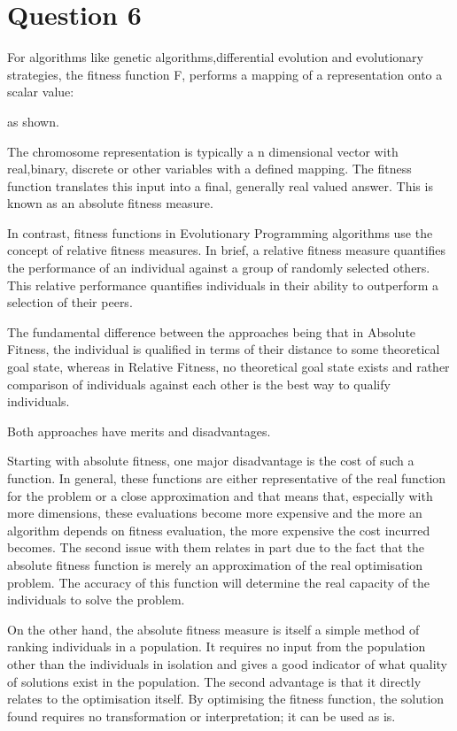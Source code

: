 \documentclass[12pt]{article}
\begin{document}
\section{Question 6}
For algorithms like genetic algorithms,differential evolution and evolutionary strategies, the fitness function F, performs a mapping of a representation onto a scalar value:

as shown.

The chromosome representation is typically a n dimensional vector with real,binary, discrete or other variables with a defined mapping. The fitness function translates this input into a final, generally real valued answer. This is known as an absolute fitness measure.

In contrast, fitness functions in Evolutionary Programming algorithms use the concept of relative fitness measures. In brief, a relative fitness measure quantifies the performance of an individual against a group of randomly selected others. This relative performance quantifies individuals in their ability to outperform a selection of their peers.

The fundamental difference between the approaches being that in Absolute Fitness, the individual is qualified in terms of their distance to some theoretical goal state, whereas in Relative Fitness, no theoretical goal state exists and rather comparison of individuals against each other is the best way to qualify individuals.

Both approaches have merits and disadvantages.

Starting with absolute fitness, one major disadvantage is the cost of such a function. In general, these functions are either representative of the real function for the problem or a close approximation and that means that, especially with more dimensions, these evaluations become more expensive and the more an algorithm depends on fitness evaluation, the more expensive the cost incurred becomes. The second issue with them relates in part due to the fact that the absolute fitness function is merely an approximation of the real optimisation problem. The accuracy of this function will determine the real capacity of the individuals to solve the problem.

On the other hand, the absolute fitness measure is itself a simple method of ranking individuals in a population. It requires no input from the population other than the individuals in isolation and gives a good indicator of what quality of solutions exist in the population.  The second advantage is that it directly relates to the optimisation itself. By optimising the fitness function, the solution found requires no transformation or interpretation; it can be used as is.
\end{document}
